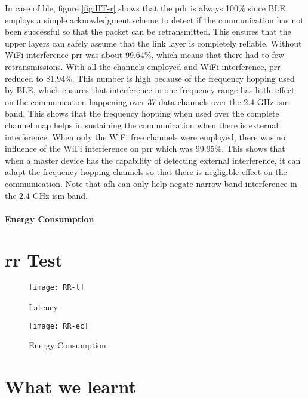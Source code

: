 In case of \gls{ble}, figure \ref{fig:HT-r} shows that the \gls{pdr} is always 100\% since BLE employs a simple acknowledgment scheme to detect if the communication has not been successful so that the packet can be retransmitted. This ensures that the upper layers can safely assume that the link layer is completely reliable. Without WiFi interference \gls{prr} was about 99.64\%, which means that there had to few retransmissions. With all the channels employed and WiFi interference, \gls{prr} reduced to 81.94\%. This number is high because of the frequency hopping used by BLE, which ensures that interference in one frequency range has little effect on the communication happening over 37 data channels over the 2.4 GHz \gls{ism} band. This shows that the frequency hopping when used over the complete channel map helps in sustaining the communication when there is external interference. When only the WiFi free channels were employed, there was no influence of the WiFi interference on \gls{prr} which was 99.95\%. This shows that when a master device has the capability of detecting external interference, it can adapt the frequency hopping channels so that there is negligible effect on the communication. Note that \gls{afh} can only help negate narrow band interference in the 2.4 GHz \gls{ism} band.

\paragraph{Energy Consumption}

\section{\acrlong{rr} Test}


\begin{figure}[h]
\texttt{[image: RR-l]}
\caption{Latency}
\label{fig:RR-l}
\end{figure}

\begin{figure}[h]
\texttt{[image: RR-ec]}
\caption{Energy Consumption}
\label{fig:RR-ec}
\end{figure}

\section{What we learnt}